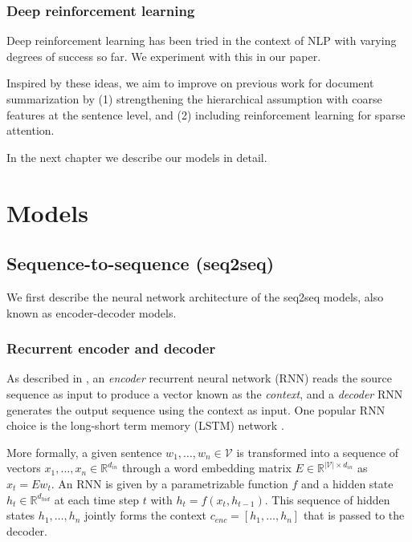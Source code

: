 \documentclass[11pt]{report}
\begin{document}
\subsection{Deep reinforcement learning}

Deep reinforcement learning has been tried in the context of NLP \citep{zaremba2015rlntm, ranzato2015, li2016dialogueRL} with varying degrees of success so far. We experiment with this in our paper.



Inspired by these ideas, we aim to improve on previous work for document summarization by (1) strengthening the hierarchical assumption with coarse features at the sentence level, and (2) including reinforcement learning for sparse attention.

In the next chapter we describe our models in detail.



\chapter{Models}

\section{Sequence-to-sequence (seq2seq)}

We first describe the neural network architecture of the seq2seq models, also known as encoder-decoder models.

\subsection{Recurrent encoder and decoder}

As described in \cite{bahdanau2014neural}, an \emph{encoder} recurrent neural network (RNN) reads the source sequence as input to produce a vector known as the \emph{context}, and a \emph{decoder} RNN generates the output sequence using the context as input.  One popular RNN choice is the long-short term memory (LSTM) network \citep{hochreiter1997long}.

More formally, a given sentence $w_1, \ldots, w_n \in \mathcal{V}$ is transformed into a sequence of vectors $x_1, \ldots, x_n \in \mathbb{R}^{d_{in}}$ through a word embedding matrix $E \in \mathbb{R}^{|\mathcal{V}| \times d_{in}}$ as $x_t = Ew_t$. An RNN is given by a parametrizable function $f$ and a hidden state $h_t \in \mathbb{R}^{ d_{hid}}$ at each time step $t$ with $h_t = f(x_t, h_{t-1})$. This sequence of hidden states $h_1, \ldots, h_n$ jointly forms the context $c_{enc} = [h_1, \ldots, h_n]$ that is passed to the decoder.
\end{document}
